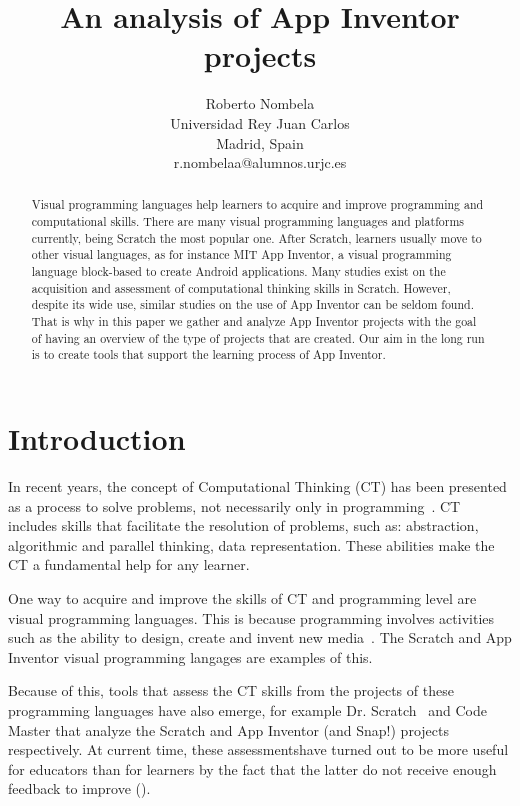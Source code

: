 \documentclass[a4paper]{article}
\title{An analysis of App Inventor projects}
\author{
Roberto Nombela \\ Universidad Rey Juan Carlos\\
                Madrid, Spain \\ r.nombelaa@alumnos.urjc.es
}
\begin{document}
\maketitle

\begin{abstract}
Visual programming languages help learners to acquire and improve programming and computational skills.
There are many visual programming languages and platforms currently, being Scratch the most popular one.
After Scratch, learners usually move to other visual languages, as for instance MIT App Inventor, a visual programming language block-based to create Android applications.
Many studies exist on the acquisition and assessment of computational thinking skills in Scratch.
However, despite its wide use, similar studies on the use of App Inventor can be seldom found.
That is why in this paper we gather and analyze App Inventor projects with the goal of having an overview of the type of projects that are created.
Our aim in the long run is to create tools that support the learning process of App Inventor.
\end{abstract}


\section{Introduction}

In recent years, the concept of Computational Thinking (CT) has been presented as a process to solve problems, not necessarily only in programming~\cite{wing2006computational}. 
CT includes skills that facilitate the resolution of problems, such as: abstraction, algorithmic and parallel thinking, data representation. These abilities make the CT a fundamental help for any learner.

One way to acquire and improve the skills of CT and programming level are visual programming languages.
This is because programming involves activities such as the ability to design, create and invent new media~\cite{resnick2009scratch}.
The Scratch and App Inventor visual programming langages are examples of this.

Because of this, tools that assess the CT skills from the projects of these programming languages have also emerge, for example Dr. Scratch~\cite{moreno2015dr} and Code Master that analyze the Scratch and App Inventor (and Snap!) projects respectively. 
At current time, these assessmentshave turned out to be more useful for educators than for learners by the fact that the latter do not receive enough feedback to improve (\cn).
\end{document}
